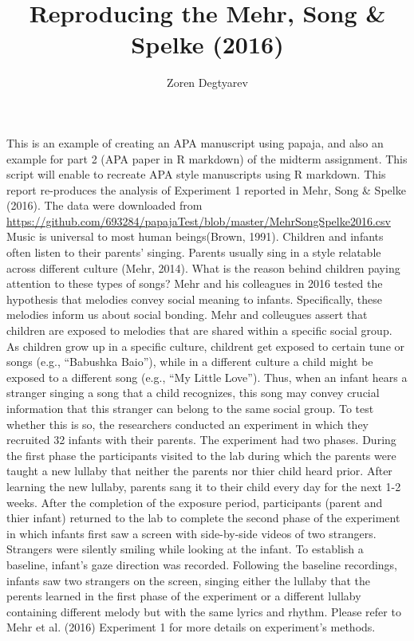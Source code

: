 \documentclass[man]{apa6}
\title{Reproducing the Mehr, Song \& Spelke (2016)}
\author{Zoren Degtyarev}
\date{}
\affiliation{
\vspace{0.5cm}
 Brooklyn College of the City University of New York}
\begin{document}
\maketitle

This is an example of creating an APA manuscript using papaja, and also
an example for part 2 (APA paper in R markdown) of the midterm
assignment. This script will enable to recreate APA style manuscripts
using R markdown. This report re-produces the analysis of Experiment 1
reported in Mehr, Song \& Spelke (2016). The data were downloaded from
\url{https://github.com/693284/papajaTest/blob/master/MehrSongSpelke2016.csv}
Music is universal to most human beings(Brown, 1991). Children and
infants often listen to their parents' singing. Parents usually sing in
a style relatable across different culture (Mehr, 2014). What is the
reason behind children paying attention to these types of songs? Mehr
and his colleagues in 2016 tested the hypothesis that melodies convey
social meaning to infants. Specifically, these melodies inform us about
social bonding. Mehr and colleugues assert that children are exposed to
melodies that are shared within a specific social group. As children
grow up in a specific culture, childrent get exposed to certain tune or
songs (e.g., \enquote{Babushka Baio}), while in a different culture a
child might be exposed to a different song (e.g., \enquote{My Little
Love}). Thus, when an infant hears a stranger singing a song that a
child recognizes, this song may convey crucial information that this
stranger can belong to the same social group. To test whether this is
so, the researchers conducted an experiment in which they recruited 32
infants with their parents. The experiment had two phases. During the
first phase the participants visited to the lab during which the parents
were taught a new lullaby that neither the parents nor thier child heard
prior. After learning the new lullaby, parents sang it to their child
every day for the next 1-2 weeks. After the completion of the exposure
period, participants (parent and thier infant) returned to the lab to
complete the second phase of the experiment in which infants first saw a
screen with side-by-side videos of two strangers. Strangers were
silently smiling while looking at the infant. To establish a baseline,
infant's gaze direction was recorded. Following the baseline recordings,
infants saw two strangers on the screen, singing either the lullaby that
the perents learned in the first phase of the experiment or a different
lullaby containing different melody but with the same lyrics and rhythm.
Please refer to Mehr et al. (2016) Experiment 1 for more details on
experiment's methods.
\end{document}
